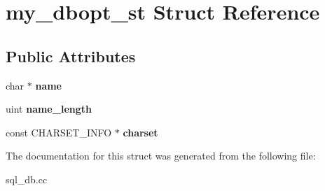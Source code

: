 \hypertarget{structmy__dbopt__st}{}\section{my\+\_\+dbopt\+\_\+st Struct Reference}
\label{structmy__dbopt__st}
\subsection*{Public Attributes}
\begin{DoxyCompactItemize}
\item 
\mbox{\label{structmy__dbopt__st_a1ee48f7030edd9b7763be928f6e5cff0}} 
char $\ast$ {\bfseries name}
\item 
\mbox{\label{structmy__dbopt__st_a9a782481a69948483bfbb0ae8caaf0f6}} 
uint {\bfseries name\+\_\+length}
\item 
\mbox{\label{structmy__dbopt__st_a48fb7756311c775e3d53397e4d8766b0}} 
const C\+H\+A\+R\+S\+E\+T\+\_\+\+I\+N\+FO $\ast$ {\bfseries charset}
\end{DoxyCompactItemize}


The documentation for this struct was generated from the following file\+:\begin{DoxyCompactItemize}
\item 
sql\+\_\+db.\+cc\end{DoxyCompactItemize}
